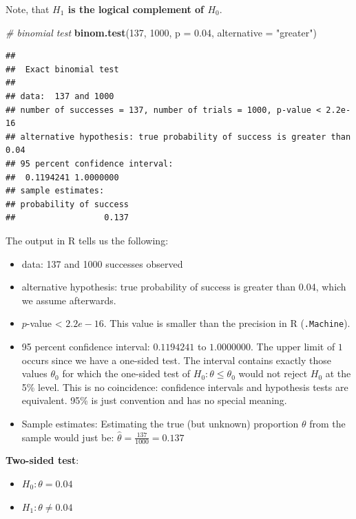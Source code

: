 \documentclass[
]{book}
\newenvironment{Shaded}{\begin{snugshade}}{\end{snugshade}}
\newcommand{\AttributeTok}[1]{\textcolor[rgb]{0.13,0.29,0.53}{#1}}
\newcommand{\CommentTok}[1]{\textcolor[rgb]{0.56,0.35,0.01}{\textit{#1}}}
\newcommand{\DecValTok}[1]{\textcolor[rgb]{0.00,0.00,0.81}{#1}}
\newcommand{\FloatTok}[1]{\textcolor[rgb]{0.00,0.00,0.81}{#1}}
\newcommand{\FunctionTok}[1]{\textcolor[rgb]{0.13,0.29,0.53}{\textbf{#1}}}
\newcommand{\NormalTok}[1]{#1}
\newcommand{\StringTok}[1]{\textcolor[rgb]{0.31,0.60,0.02}{#1}}
\providecommand{\tightlist}{%
  \setlength{\itemsep}{0pt}\setlength{\parskip}{0pt}}
\begin{document}
Note, that \textbf{\(H_1\) is the logical complement of \(H_0\)}.

\begin{Shaded}
\begin{Highlighting}[]
\CommentTok{\# binomial test}
\FunctionTok{binom.test}\NormalTok{(}\DecValTok{137}\NormalTok{, }\DecValTok{1000}\NormalTok{, }\AttributeTok{p =} \FloatTok{0.04}\NormalTok{, }\AttributeTok{alternative =} \StringTok{"greater"}\NormalTok{)}
\end{Highlighting}
\end{Shaded}

\begin{verbatim}
## 
##  Exact binomial test
## 
## data:  137 and 1000
## number of successes = 137, number of trials = 1000, p-value < 2.2e-16
## alternative hypothesis: true probability of success is greater than 0.04
## 95 percent confidence interval:
##  0.1194241 1.0000000
## sample estimates:
## probability of success 
##                  0.137
\end{verbatim}

The output in R tells us the following:

\begin{itemize}
\tightlist
\item
  data: 137 and 1000 successes observed
\item
  alternative hypothesis: true probability of success is greater than 0.04, which we assume afterwards.
\item
  \(p\)-value \textless{} \(2.2e-16\). This value is smaller than the precision in R (\texttt{.Machine}).
\item
  95 percent confidence interval: \(0.1194241\) to \(1.0000000\).
  The upper limit of \(1\) occurs since we have a one-sided test.
  The interval contains exactly those values \(\theta_0\) for which the one-sided test of \(H_0: \theta \le \theta_0\)
  would not reject \(H_0\) at the 5\% level.
  This is no coincidence: confidence intervals and hypothesis tests are equivalent.
  95\% is just convention and has no special meaning.
\item
  Sample estimates: Estimating the true (but unknown) proportion \(\theta\) from the sample would just be:
  \(\hat{\theta} = \frac{137}{1000} = 0.137\)
\end{itemize}

\textbf{Two-sided test}:

\begin{itemize}
\tightlist
\item
  \(H_0: \theta = 0.04\)
\item
  \(H_1: \theta \ne 0.04\)
\end{itemize}
\end{document}
